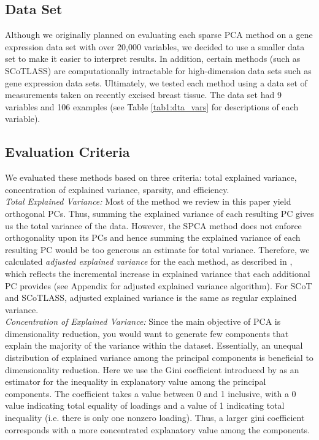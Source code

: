 \documentclass[11pt,letterpaper]{report}
\begin{document}
\subsection*{Data Set}

Although we originally planned on evaluating each sparse PCA method on a gene expression data set with over 20,000 variables, we decided to use a smaller data set to make it easier to interpret results. In addition, certain methods (such as SCoTLASS) are computationally intractable for high-dimension data sets such as gene expression data sets. Ultimately, we tested each method using a data set of measurements taken on recently excised breast tissue. The data set had 9 variables and 106 examples (see Table \ref{tab1:dta_vars} for descriptions of each variable). \\

\subsection*{Evaluation Criteria}

We evaluated these methods based on three criteria: total explained variance, concentration of explained variance, sparsity, and efficiency.\\

\textit{Total Explained Variance:} Most of the method we review in this paper yield orthogonal PCs. Thus, summing the explained variance of each resulting PC gives us the total variance of the data. However, the SPCA method does not enforce orthogonality upon its PCs and hence summing the explained variance of each resulting PC would be too generous an estimate for total variance. Therefore, we calculated \textit{adjusted explained variance} for the each method, as described in \citeyear{Shen2008}, which reflects the incremental increase in explained variance that each additional PC provides (see Appendix for adjusted explained variance algorithm). For SCoT and SCoTLASS, adjusted explained variance is the same as regular explained variance.\\

\textit{Concentration of Explained Variance:} Since the main objective of PCA is dimensionality reduction, you would want to generate few components that explain the majority of the variance within the dataset. Essentially, an unequal distribution of explained variance among the principal components is beneficial to dimensionality reduction. Here we use the Gini coefficient introduced by  as an estimator for the inequality in explanatory value among the principal components. The coefficient takes a value between 0 and 1 inclusive, with a 0 value indicating total equality of loadings and a value of 1 indicating total inequality (i.e. there is only one nonzero loading). Thus, a larger gini coefficient corresponds with a more concentrated explanatory value among the components.\\ 
\end{document}
